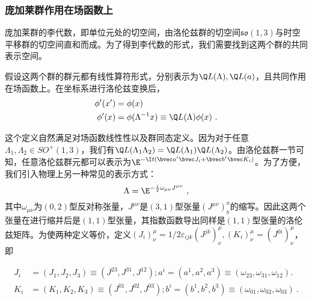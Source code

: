 \subsubsection{庞加莱群作用在场函数上}
庞加莱群的李代数，即单位元处的切空间，由洛伦兹群的切空间$\mathfrak {so}(1,3)$与时空平移群的切空间直和而成。为了得到李代数的形式，我们需要找到这两个群的共同表示空间。

假设这两个群的群元都有线性算符形式，分别表示为$\Q L(\Lambda),\Q L(a)$，且共同作用在场函数上。在坐标系进行洛伦兹变换后，
\begin{equation}\label{eq_PoinGr_1}
\begin{aligned}
\phi'(x')&=\phi(x)\\
\phi'(x)&=\phi(\Lambda^{-1}x)\equiv \Q L(\Lambda)\phi(x)~.
\end{aligned}
\end{equation}

这个定义自然满足对场函数线性性以及群同态定义。因为对于任意$\Lambda_1,\Lambda_2\in SO^+(1,3)$，我们有$\Q L(\Lambda_1\Lambda_2)=\Q L(\Lambda_1)\Q L(\Lambda_2)$。由洛伦兹群一节可知，任意洛伦兹群元都可以表示为$\E^{-\I t(\bvec a^i\bvec J_i+\bvec b^i\bvec K_i)}$。为了方便，我们引入物理上另一种常见的表示方式：
\begin{equation}
\Lambda=\E^{-\frac{i}{2} \omega_{\mu \nu} J^{\mu \nu}}
~,
\end{equation}
其中$\omega_{\mu\nu}$为$(0,2)$型反对称张量，$J^{\mu\nu}$是$(3,1)$型张量$(J^{\mu\nu})^a_b$的缩写。因此这两个张量在进行缩并后是$(1,1)$型张量，其指数函数导出同样是$(1,1)$型张量的洛伦兹矩阵。为使两种定义等价，定义$(J_i)^{\mu}_{\nu}=1/2\varepsilon_{ijk}(J^{jk})^{\mu}_{\nu},(K_i)^{\mu}_{\nu}=(J^{0i})^{\mu}_{\nu}$，即

\begin{equation}\label{eq_PoinGr_2}
\begin{aligned}
J_i&=(J_1,J_2,J_3)\equiv(J^{23},J^{31},J^{12});a^i=(a^1,a^2,a^3)\equiv(\omega_{23},\omega_{31},\omega_{12}).\\
K_i&=(K_1,K_2,K_3)\equiv(J^{01},J^{02},J^{03});b^i=(b^1,b^2,b^3)\equiv(\omega_{01},\omega_{02},\omega_{03})~.
\end{aligned}
\end{equation}

